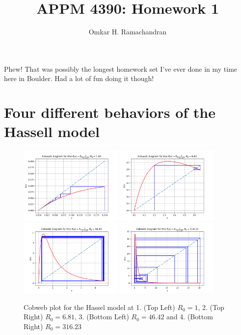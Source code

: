 \documentclass[english]{article}
\begin{document}
\title{APPM 4390: Homework 1}
\author{Omkar H. Ramachandran}
\date{}
\maketitle
Phew! That was possibly the longest homework set I've ever done in my time
here in Boulder. Had a lot of fun doing it though!
\section{Four different behaviors of the Hassell model}
\begin{figure}[H]
	\centering
	\includegraphics[width=0.45\textwidth]{plots/Problem1_R0_1.png}
	\includegraphics[width=0.45\textwidth]{plots/Problem1_R0_6p81.png}
	\includegraphics[width=0.45\textwidth]{plots/Problem1_R0_46p42.png}
	\includegraphics[width=0.45\textwidth]{plots/Problem1_R0_316p23.png}
	\caption{Cobweb plot for the Hassel model at 1. (Top Left) $R_{0} = 1$, 
	2. (Top Right) $R_{0} = 6.81$, 3. (Bottom Left) $R_{0} = 46.42$ and 4. (Bottom Right)
	$R_{0} = 316.23$}
	\label{fig:problem1}
\end{figure}
\end{document}
